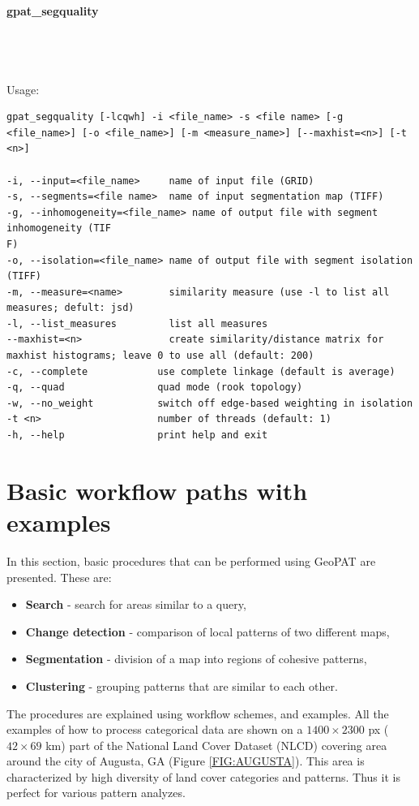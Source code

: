 \documentclass[12pt,margin=0.5in]{article}
\newcommand{\newparagraph}[1]{\paragraph{#1}\mbox{}\\}
\begin{document}
\newparagraph{gpat\_segquality}
{}
\\\\
Usage:

\begin{minipage}{\linewidth}
\begin{lstlisting}
gpat_segquality [-lcqwh] -i <file_name> -s <file name> [-g <file_name>] [-o <file_name>] [-m <measure_name>] [--maxhist=<n>] [-t <n>]

-i, --input=<file_name>     name of input file (GRID)
-s, --segments=<file name>  name of input segmentation map (TIFF)
-g, --inhomogeneity=<file_name> name of output file with segment inhomogeneity (TIF
F)
-o, --isolation=<file_name> name of output file with segment isolation (TIFF)
-m, --measure=<name>        similarity measure (use -l to list all measures; defult: jsd)
-l, --list_measures         list all measures
--maxhist=<n>               create similarity/distance matrix for maxhist histograms; leave 0 to use all (default: 200)
-c, --complete            use complete linkage (default is average)
-q, --quad                quad mode (rook topology)
-w, --no_weight           switch off edge-based weighting in isolation
-t <n>                    number of threads (default: 1)
-h, --help                print help and exit
\end{lstlisting}
\end{minipage}

\section{Basic workflow paths with examples}

In this section, basic procedures that can be performed using GeoPAT are presented. These are: 
\begin{itemize}
	\item {\bf Search} - search for areas similar to a query,
	\item {\bf Change detection} - comparison of local patterns of two different maps,
	\item {\bf Segmentation} - division of a map into regions of cohesive patterns,
	\item {\bf Clustering} - grouping patterns that are similar to each other.
\end{itemize}
The procedures are explained using workflow schemes, and examples. All the examples of how to process categorical data are shown on a $1400\times 2300$ px ($42\times 69$ km) part of the National Land Cover Dataset (NLCD) covering area around the city of Augusta, GA (Figure \ref{FIG:AUGUSTA}). This area is characterized by high diversity of land cover categories and patterns. Thus it is perfect for various pattern analyzes. 
\end{document}

